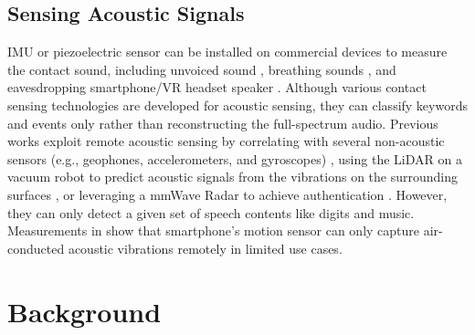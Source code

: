 \subsection{Sensing Acoustic Signals}

IMU or piezoelectric sensor \citep{maruri2018v} can be installed on commercial devices to measure the contact sound, including unvoiced sound \citep{khanna2021jawsense}, breathing sounds \citep{gupta2018precision}, and eavesdropping smartphone/VR headset speaker \citep{ba2020learning, wang2021audio, su2021towards, shi2021face}. 
Although various contact sensing technologies are developed for acoustic sensing, they can classify keywords and events only rather than reconstructing the full-spectrum audio.
Previous works exploit remote acoustic sensing by correlating with several non-acoustic sensors (e.g., geophones, accelerometers, and gyroscopes) \citep{han2017pitchln}, using the LiDAR on a vacuum robot to predict acoustic signals from the vibrations on the surrounding surfaces \citep{sami2020spying}, or leveraging a mmWave Radar to achieve authentication \citep{li2020vocalprint}. 
However, they can only detect a given set of speech contents like digits and music. Measurements in \citep{anand2018speechless} show that smartphone's motion sensor can only capture air-conducted acoustic vibrations remotely in limited use cases.


\section{Background}\label{sec:vibvoice_background}
